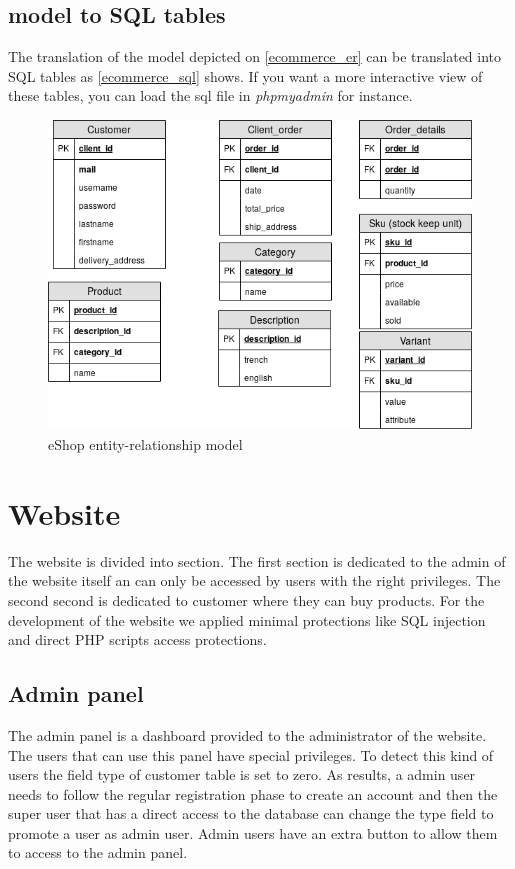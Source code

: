 \documentclass{article}
\begin{document}
\subsection{model to SQL tables}
The translation of the model depicted on \autoref{ecommerce_er} can be translated into SQL tables as \autoref{ecommerce_sql} shows. If you want a more interactive view of these tables, you can load the sql file in \textit{phpmyadmin} for instance.

\begin{figure}[h!]
    \centering
    \includegraphics[scale=0.4]{./images/ecommerce_SQL.png}
    \caption{eShop entity-relationship model}
    \label{ecommerce_sql}
\end{figure}

\section{Website}
The website is divided into section. The first section is dedicated to the admin of the website itself an can only be accessed by users with the right privileges. The second second is dedicated to customer where they can buy products. For the development of the website we applied minimal protections like SQL injection and direct PHP scripts access protections.

\subsection{Admin panel}
The admin panel is a dashboard provided to the administrator of the website. The users that can use this panel have special privileges. To detect this kind of users the field type of customer table is set to zero. As results, a admin user needs to follow the regular registration phase to create an account and then the super user that has a direct access to the database can change the type field to promote a user as admin user. Admin users have an extra button to allow them to access to the admin panel.\\
\end{document}
